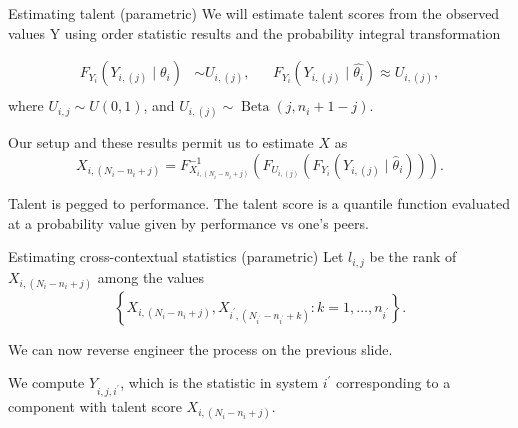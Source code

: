 \documentclass[
  ignorenonframetext,
]{beamer}
\begin{document}
\begin{frame}{Estimating talent (parametric)}
\protect\hypertarget{estimating-talent-parametric}{}
We will estimate talent scores from the observed values Y using order
statistic results and the probability integral transformation

\[
\begin{aligned}
F_{Y_i}\left(Y_{i,(j)} \mid \theta_i\right) & \sim U_{i,(j)}, & & F_{Y_i}\left(Y_{i,(j)} \mid \hat{\theta_i}\right) \approx U_{i,(j)}, \\
\end{aligned}
\] where \(U_{i,j} \sim U(0,1)\), and
\(U_{i,(j)} \sim \operatorname{Beta}(j, n_i+1-j)\).

\vspace{12pt}

Our setup and these results permit us to estimate \(X\) as \[
X_{i, (N_i-n_i+j)} = F_{X_{i, (N_i-n_i+j)}}^{-1}\left(F_{U_{i,(j)}}\left(F_{Y_{i}}\left(Y_{i,(j)} \mid \hat{\theta}_i\right)\right)\right) .
\]

\vspace{12pt}

Talent is pegged to performance. The talent score is a quantile function
evaluated at a probability value given by performance vs one's peers.
\end{frame}

\begin{frame}{Estimating cross-contextual statistics (parametric)}
\protect\hypertarget{estimating-cross-contextual-statistics-parametric}{}
Let \(l_{i, j}\) be the rank of \(X_{i,\left(N_{i}-n_{i}+j\right)}\)
among the values \[
\left\{X_{i,\left(N_{i}-n_{i}+j\right)}, X_{i^{\prime},\left(N_{i^{\prime}}-n_{i^{\prime}}+k\right)}: k=1, \ldots, n_{i^{\prime}}\right\} .
\]

\vspace{12pt}

We can now reverse engineer the process on the previous slide.

\vspace{12pt}

We compute \(Y_{i, j, i^{\prime}}\), which is the statistic in system
\(i^{\prime}\) corresponding to a component with talent score
\(X_{i,\left(N_{i}-n_{i}+j\right)}\).
\end{frame}
\end{document}
